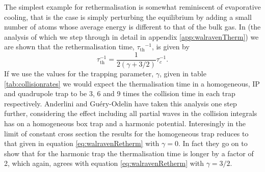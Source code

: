 The simplest example for rethermalisation is somewhat reminiscent of evaporative cooling, that is the case is simply perturbing the equilibrium by adding a small number of atoms whose average energy is different to that of the bulk gas.
In \cite{Walraven2010} (the analysis of which we step through in detail in appendix \ref{app:walravenTherm}) we are shown that the rethermalisation time, ${\tau_{\mathrm{th}}}^{-1}$, is given by
\begin{equation}
    \tau_{\mathrm{th}}^{-1} = \frac{1}{2\left(\gamma + 3/2\right)} \tau_{c}^{-1}. \label{eq:walravenRetherm}
\end{equation}
If we use the values for the trapping parameter, $\gamma$, given in table \ref{tab:collisionrates} we would expect the thermalisation time in a homogeneous, IP and quadrupole trap to be 3, 6 and 9 times the collision time in each trap respectively.
Anderlini and Gu\'ery-Odelin \cite{Anderlini2006} have taken this analysis one step further, considering the effect including all partial waves in the collision integrals has on a homogeneous box trap and a harmonic potential.
Interesingly in the limit of constant cross section the results for the homogeneous trap reduces to that given in equation \eqref{eq:walravenRetherm} with $\gamma=0$.
In fact they go on to show that for the harmonic trap the thermalisation time is longer by a factor of 2, which again, agrees with equation \eqref{eq:walravenRetherm} with $\gamma=3/2$.

